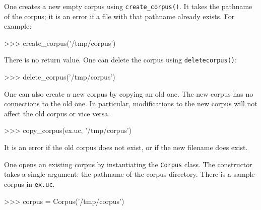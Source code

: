 One creates a new empty corpus using \verb|create_corpus()|.  It takes
the pathname of the corpus; it is an error if a file with that
pathname already exists.  For example:
\begin{python}
>>> create_corpus('/tmp/corpus')
\end{python}
There is no return value.
One can delete the corpus using {\tt delete{\underscore}corpus()}:
\begin{python}
>>> delete_corpus('/tmp/corpus')
\end{python}

One can also create a new corpus by copying an old one.  The new
corpus has no connections to the old one.  In particular,
modifications to the new corpus will not affect the old corpus or vice
versa.
\begin{python}
>>> copy_corpus(ex.uc, '/tmp/corpus')
\end{python}
It is an error if the old corpus does not exist, or if the new
filename does exist.

One opens an existing corpus
by instantiating the {\tt Corpus} class.  The
constructor takes a single argument: the pathname of the corpus
directory.  There is a sample corpus in {\tt ex.uc}.
\begin{python}
>>> corpus = Corpus('/tmp/corpus')
\end{python}

